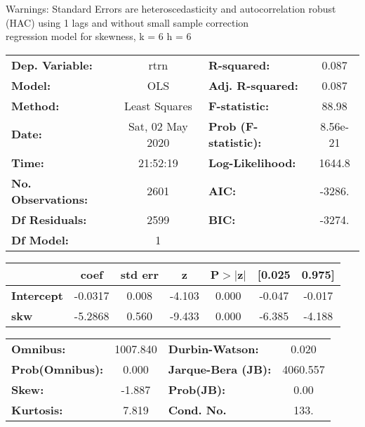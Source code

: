 Warnings: \newline
 [1] Standard Errors are heteroscedasticity and autocorrelation robust (HAC) using 1 lags and without small sample correction\\ 

regression model for skewness, k = 6 h = 6\begin{center}
\begin{tabular}{lclc}
\toprule
\textbf{Dep. Variable:}    &       rtrn       & \textbf{  R-squared:         } &     0.087   \\
\textbf{Model:}            &       OLS        & \textbf{  Adj. R-squared:    } &     0.087   \\
\textbf{Method:}           &  Least Squares   & \textbf{  F-statistic:       } &     88.98   \\
\textbf{Date:}             & Sat, 02 May 2020 & \textbf{  Prob (F-statistic):} &  8.56e-21   \\
\textbf{Time:}             &     21:52:19     & \textbf{  Log-Likelihood:    } &    1644.8   \\
\textbf{No. Observations:} &        2601      & \textbf{  AIC:               } &    -3286.   \\
\textbf{Df Residuals:}     &        2599      & \textbf{  BIC:               } &    -3274.   \\
\textbf{Df Model:}         &           1      & \textbf{                     } &             \\
\bottomrule
\end{tabular}
\begin{tabular}{lcccccc}
                   & \textbf{coef} & \textbf{std err} & \textbf{z} & \textbf{P$> |$z$|$} & \textbf{[0.025} & \textbf{0.975]}  \\
\midrule
\textbf{Intercept} &      -0.0317  &        0.008     &    -4.103  &         0.000        &       -0.047    &       -0.017     \\
\textbf{skw}       &      -5.2868  &        0.560     &    -9.433  &         0.000        &       -6.385    &       -4.188     \\
\bottomrule
\end{tabular}
\begin{tabular}{lclc}
\textbf{Omnibus:}       & 1007.840 & \textbf{  Durbin-Watson:     } &    0.020  \\
\textbf{Prob(Omnibus):} &   0.000  & \textbf{  Jarque-Bera (JB):  } & 4060.557  \\
\textbf{Skew:}          &  -1.887  & \textbf{  Prob(JB):          } &     0.00  \\
\textbf{Kurtosis:}      &   7.819  & \textbf{  Cond. No.          } &     133.  \\
\bottomrule
\end{tabular}
\end{center}

